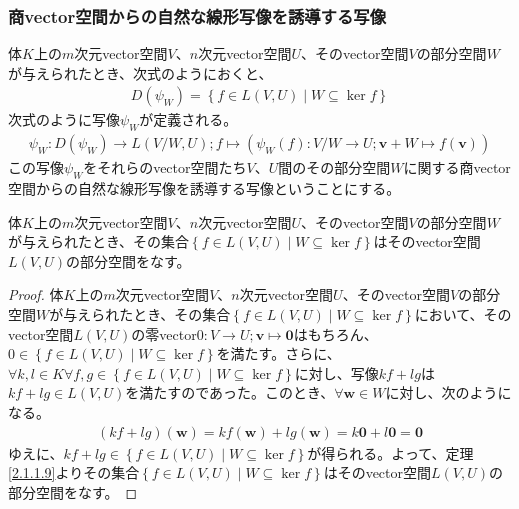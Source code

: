 \documentclass[dvipdfmx]{jsarticle}
\begin{document}
\subsubsection{商vector空間からの自然な線形写像を誘導する写像}%
\begin{dfn}
体$K$上の$m$次元vector空間$V$、$n$次元vector空間$U$、そのvector空間$V$の部分空間$W$が与えられたとき、次式のようにおくと、
\begin{align*}
D\left( \psi_{W} \right) = \left\{ f \in L(V,U) \middle| W \subseteq \ker f \right\}
\end{align*}
次式のように写像$\psi_{W}$が定義される。
\begin{align*}
\psi_{W}:D\left( \psi_{W} \right) \rightarrow L\left( {V}/{W},U \right);f \mapsto \left( \psi_{W}(f):{V}/{W} \rightarrow U;\mathbf{v} + W \mapsto f\left( \mathbf{v} \right) \right)
\end{align*}
この写像$\psi_{W}$をそれらのvector空間たち$V$、$U$間のその部分空間$W$に関する商vector空間からの自然な線形写像を誘導する写像ということにする。
\end{dfn}
\begin{thm}\label{2.4.4.6}
体$K$上の$m$次元vector空間$V$、$n$次元vector空間$U$、そのvector空間$V$の部分空間$W$が与えられたとき、その集合$\left\{ f \in L(V,U) \middle| W \subseteq \ker f \right\}$はそのvector空間$L(V,U)$の部分空間をなす。
\end{thm}
\begin{proof}
体$K$上の$m$次元vector空間$V$、$n$次元vector空間$U$、そのvector空間$V$の部分空間$W$が与えられたとき、その集合$\left\{ f \in L(V,U) \middle| W \subseteq \ker f \right\}$において、そのvector空間$L(V,U)$の零vector$0:V \rightarrow U;\mathbf{v} \mapsto \mathbf{0}$はもちろん、$0 \in \left\{ f \in L(V,U) \middle| W \subseteq \ker f \right\}$を満たす。さらに、$\forall k,l \in K\forall f,g \in \left\{ f \in L(V,U) \middle| W \subseteq \ker f \right\}$に対し、写像$kf + lg$は$kf + lg \in L(V,U)$を満たすのであった。このとき、$\forall\mathbf{w} \in W$に対し、次のようになる。
\begin{align*}
(kf + lg)\left( \mathbf{w} \right) = kf\left( \mathbf{w} \right) + lg\left( \mathbf{w} \right) = k\mathbf{0} + l\mathbf{0} = \mathbf{0}
\end{align*}
ゆえに、$kf + lg \in \left\{ f \in L(V,U) \middle| W \subseteq \ker f \right\}$が得られる。よって、定理\ref{2.1.1.9}よりその集合$\left\{ f \in L(V,U) \middle| W \subseteq \ker f \right\}$はそのvector空間$L(V,U)$の部分空間をなす。
\end{proof}
\end{document}
